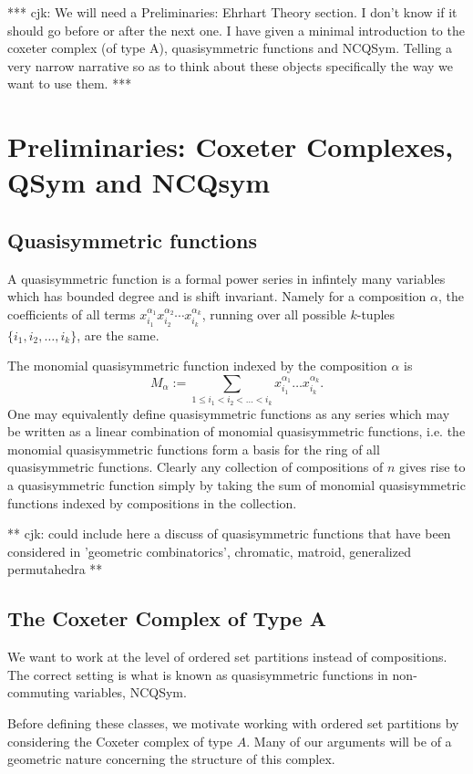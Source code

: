 \documentclass[12pt]{amsart}
\begin{document}
*** cjk: We will need a Preliminaries: Ehrhart Theory section.  I don't know if it should go before or after the next one.
I have given a minimal introduction to the coxeter complex (of type A), quasisymmetric functions and NCQSym.  Telling a very narrow narrative so as to think about these objects specifically the way we want to use them. ***



\section{Preliminaries: Coxeter Complexes, QSym and NCQsym}

\subsection{Quasisymmetric functions}
A quasisymmetric function is a formal power series in infintely many
variables which has bounded degree and is shift invariant.  Namely for
a composition $\alpha$, the coefficients of all terms
$x_{i_1}^{\alpha_1}x_{i_2}^{\alpha_2} \cdots x_{i_k}^{\alpha_k}$,
running over all possible $k$-tuples $\{i_1, i_2, \ldots, i_k \}$, are
the same.


The monomial quasisymmetric function indexed by the composition $\alpha$ is 
$$M_{\alpha} := \sum_{1 \leq i_1 < i_2 < \ldots < i_k}
x_{i_1}^{\alpha_1} \ldots x_{i_k}^{\alpha_k}.$$  One may equivalently
define quasisymmetric functions as any series which may be written as a
linear combination of monomial quasisymmetric functions, i.e. the
monomial quasisymmetric functions form a basis for the ring of all
quasisymmetric functions.  Clearly any collection of
compositions of $n$ gives rise to a quasisymmetric function simply by
taking the sum of monomial quasisymmetric functions indexed by
compositions in the collection.

** cjk: could include here a discuss of quasisymmetric functions that have
been considered in 'geometric combinatorics', chromatic, matroid,
generalized permutahedra **

\subsection{The Coxeter Complex of Type A}
We want to work at the level of ordered set partitions instead of
compositions.  The correct setting is what is known as 
quasisymmetric functions in non-commuting variables, NCQSym.

Before defining these classes, we motivate working with ordered set
partitions by considering the Coxeter complex of type $A$.  Many of
our arguments will be of a geometric nature concerning the structure
of this complex.
\end{document}
